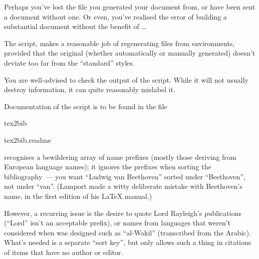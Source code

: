 
Perhaps you've lost the  file you generated your document from,
or have been sent a document without one.  Or even, you've realised
the error of building a substantial document without the benefit of
\BibTeX{}\dots{}

The  script,  makes a reasonable job
of regenerating  files from 
environments, provided that the original (whether automatically or
manually generated) doesn't deviate too far from the ``standard''
styles.

You are well-advised to check the output of the script.  While it will
not usually destroy information, it can quite reasonably mislabel it.

Documentation of the script is to be found in the file 
\begin{ctanrefs}
\item[tex2bib]
\item[tex2bib.readme]
\end{ctanrefs}


\BibTeX{} recognises a bewildering array of name prefixes (mostly
those deriving from European language names); it ignores the prefixes
when sorting the bibliography~--- you want ``Ludwig van Beethoven''
sorted under ``Beethoven'', not under ``van''.  (Lamport made a witty
deliberate mistake with Beethoven's name, in the first edition of his
\LaTeX{} manual.)

However, a recurring issue is the desire to quote Lord Rayleigh's
publications (``Lord'' isn't an acceptable prefix), or names from
languages that weren't considered when \BibTeX{} was designed such as
``al-Wakil'' (transcribed from the Arabic).  What's needed is a
separate ``sort key'', but \BibTeX{} only allows such a thing in
citations of items that have no author or editor.

